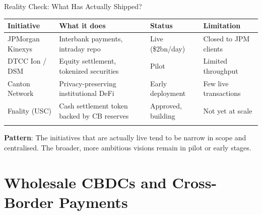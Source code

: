 \documentclass[10pt]{beamer}
\begin{document}
\begin{frame}{Reality Check: What Has Actually Shipped?}
  \begin{center}
    \small
    \begin{tabular}{p{2.5cm}p{2.5cm}p{2cm}p{2.5cm}}
      \toprule
      \textbf{Initiative} & \textbf{What it does} & \textbf{Status} & \textbf{Limitation} \\
      \midrule
      JPMorgan Kinexys & Interbank payments, intraday repo & Live (\$2bn/day) & Closed to JPM clients \\
      \addlinespace
      DTCC Ion / DSM & Equity settlement, tokenized securities & Pilot & Limited throughput \\
      \addlinespace
      Canton Network & Privacy-preserving institutional DeFi & Early deployment & Few live transactions \\
      \addlinespace
      Fnality (USC) & Cash settlement token backed by CB reserves & Approved, building & Not yet at scale \\
      \addlinespace
      \bottomrule
    \end{tabular}
  \end{center}
  
  \vspace{0.3em}
  \textbf{Pattern}: The initiatives that are actually live tend to be narrow in scope and centralised. The broader, more ambitious visions remain in pilot or early stages.
  
\end{frame}

\section{Wholesale CBDCs and Cross-Border Payments}
\end{document}

